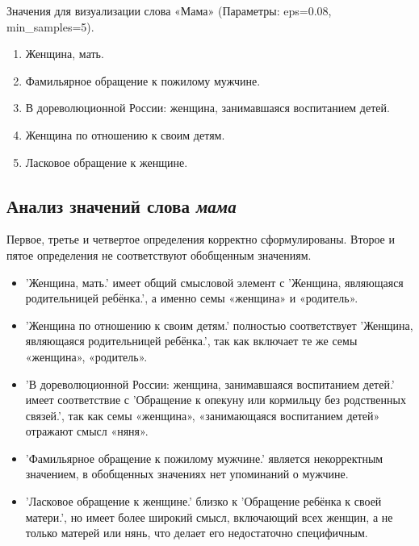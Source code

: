 Значения для визуализации слова «Мама» (Параметры: eps=0.08, min\_samples=5).

\begin{enumerate}
    \item Женщина, мать.
    \item Фамильярное обращение к пожилому мужчине.
    \item В дореволюционной России: женщина, занимавшаяся воспитанием детей.
    \item Женщина по отношению к своим детям.
    \item Ласковое обращение к женщине.
\end{enumerate}

\subsection*{Анализ значений слова \textit{мама}}

Первое, третье и четвертое определения корректно сформулированы.
Второе и пятое определения не соответствуют обобщенным значениям.

\begin{itemize}
    \item ’Женщина, мать.’ имеет общий смысловой элемент с
’Женщина, являющаяся родительницей ребёнка.’, а именно семы «женщина» и «родитель».

    \item ’Женщина по отношению к своим детям.’ полностью соответствует
’Женщина, являющаяся родительницей ребёнка.’, так как включает те же семы «женщина», «родитель».

    \item ’В дореволюционной России: женщина, занимавшаяся воспитанием детей.’ имеет соответствие с
’Обращение к опекуну или кормильцу без родственных связей.’,
так как семы «женщина», «занимающаяся воспитанием детей» отражают смысл «няня».
\end{itemize}

\begin{itemize}
    \item ’Фамильярное обращение к пожилому мужчине.’ является некорректным значением,
в обобщенных значениях нет упоминаний о мужчине.

    \item ’Ласковое обращение к женщине.’ близко к
’Обращение ребёнка к своей матери.’, но имеет более широкий смысл, включающий всех женщин,
а не только матерей или нянь, что делает его недостаточно специфичным.
\end{itemize}

